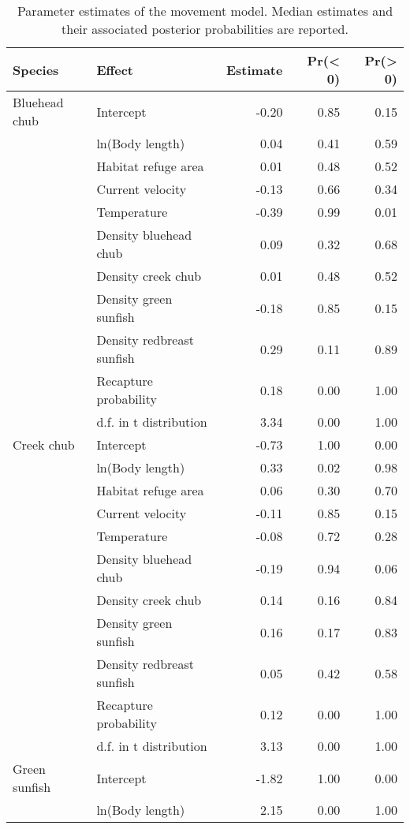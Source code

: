 \begin{longtable}{llrrr}
\caption{Parameter estimates of the movement model. Median estimates and their associated posterior probabilities are reported.} \\ 
  \hline
Species & Effect & Estimate & Pr(< 0) & Pr(> 0) \\ 
  \hline
Bluehead chub & Intercept & -0.20 & 0.85 & 0.15 \\ 
   & ln(Body length) & 0.04 & 0.41 & 0.59 \\ 
   & Habitat refuge area & 0.01 & 0.48 & 0.52 \\ 
   & Current velocity & -0.13 & 0.66 & 0.34 \\ 
   & Temperature & -0.39 & 0.99 & 0.01 \\ 
   & Density bluehead chub & 0.09 & 0.32 & 0.68 \\ 
   & Density creek chub & 0.01 & 0.48 & 0.52 \\ 
   & Density green sunfish & -0.18 & 0.85 & 0.15 \\ 
   & Density redbreast sunfish & 0.29 & 0.11 & 0.89 \\ 
   & Recapture probability & 0.18 & 0.00 & 1.00 \\ 
   & d.f. in t distribution & 3.34 & 0.00 & 1.00 \\ 
  Creek chub & Intercept & -0.73 & 1.00 & 0.00 \\ 
   & ln(Body length) & 0.33 & 0.02 & 0.98 \\ 
   & Habitat refuge area & 0.06 & 0.30 & 0.70 \\ 
   & Current velocity & -0.11 & 0.85 & 0.15 \\ 
   & Temperature & -0.08 & 0.72 & 0.28 \\ 
   & Density bluehead chub & -0.19 & 0.94 & 0.06 \\ 
   & Density creek chub & 0.14 & 0.16 & 0.84 \\ 
   & Density green sunfish & 0.16 & 0.17 & 0.83 \\ 
   & Density redbreast sunfish & 0.05 & 0.42 & 0.58 \\ 
   & Recapture probability & 0.12 & 0.00 & 1.00 \\ 
   & d.f. in t distribution & 3.13 & 0.00 & 1.00 \\ 
  Green sunfish & Intercept & -1.82 & 1.00 & 0.00 \\ 
   & ln(Body length) & 2.15 & 0.00 & 1.00 \\ 

\end{longtable}
